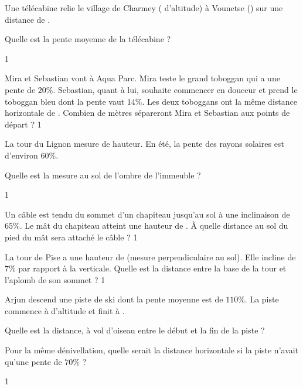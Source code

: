 \documentclass[a4paper,11pt]{report}
\begin{document}
\begin{exo}{
Une télécabine relie le village de Charmey ( d'altitude) à Vounetse () sur une distance de .

Quelle est la pente moyenne de la télécabine ?
}{1}
\end{exo}



\begin{exo}{
Mira et Sebastian vont à Aqua Parc. Mira teste le grand toboggan qui a une
pente de $20\%$. Sebastian, quant à lui, souhaite
commencer en douceur et prend le toboggan bleu dont la pente vaut $14\%$. Les deux toboggans ont la même distance horizontale de . Combien de mètres sépareront Mira et Sebastian aux points de départ ?
}{1}    
\end{exo}



\begin{exo}{
    La tour du Lignon mesure  de hauteur. En été, la pente des rayons solaires est d'environ $60\%$.
    
    Quelle est la mesure au sol de l'ombre de l'immeuble ?
}{1}
\end{exo}


\begin{exo}{
    Un câble est tendu du sommet d'un chapiteau jusqu'au sol à une inclinaison de $65\%$. Le mât du chapiteau atteint une hauteur de . À quelle distance au sol du pied du mât sera attaché le câble ?
}{1}
\end{exo}


\begin{exo}{
 La tour de Pise a une hauteur de  (mesure perpendiculaire au sol). Elle incline de $7\%$ par rapport à la verticale. Quelle est la distance entre la base de la tour et l'aplomb de son sommet ?
}{1}
\end{exo}

\begin{exo}{
Arjun descend une piste de ski dont la pente moyenne est de $110\%$. La piste commence à  d'altitude et finit à .

\begin{tasks}
    \task Quelle est la distance, à vol d'oiseau entre le début et la fin de la piste ?

    \task Pour la même dénivellation, quelle serait la distance horizontale si la piste n'avait qu'une pente de $70\%$ ?
\end{tasks}

}{1}    
\end{exo}
\end{document}
